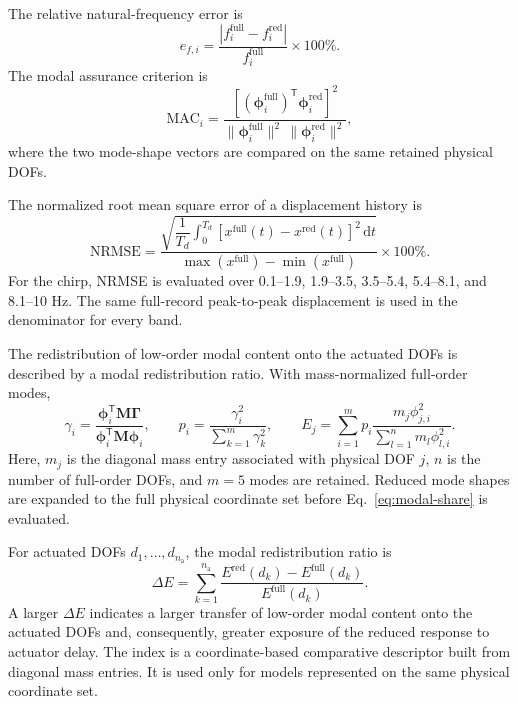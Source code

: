 \documentclass[11pt]{article}
\newenvironment{revision}{\begingroup\color{red}}{\endgroup}
\begin{document}
The relative natural-frequency error is
\begin{equation}
    e_{f,i}=\frac{|f_i^{\mathrm{full}}-f_i^{\mathrm{red}}|}{f_i^{\mathrm{full}}}\times 100\%.
    \label{eq:freq-error}
\end{equation}
The modal assurance criterion is
\begin{equation}
    \mathrm{MAC}_{i}
    =\frac{\left[(\bm{\phi}_{i}^{\mathrm{full}})^{\mathsf{T}}\bm{\phi}_{i}^{\mathrm{red}}\right]^2}
    {\|\bm{\phi}_{i}^{\mathrm{full}}\|^2\,\|\bm{\phi}_{i}^{\mathrm{red}}\|^2},
    \label{eq:mac}
\end{equation}
where the two mode-shape vectors are compared on the same retained physical DOFs.

The normalized root mean square error of a displacement history is
\begin{equation}
    \mathrm{NRMSE}
    =\frac{\sqrt{\dfrac{1}{T_d}\int_{0}^{T_d}
    [x^{\mathrm{full}}(t)-x^{\mathrm{red}}(t)]^2\,\mathrm{d}t}}
    {\max(x^{\mathrm{full}})-\min(x^{\mathrm{full}})}\times 100\%.
    \label{eq:nrmse}
\end{equation}
For the chirp, NRMSE is evaluated over 0.1--1.9, 1.9--3.5, 3.5--5.4, 5.4--8.1, and 8.1--10 Hz. The same full-record peak-to-peak displacement is used in the denominator for every band.

\begin{revision}
The redistribution of low-order modal content onto the actuated DOFs is described by a modal redistribution ratio. With mass-normalized full-order modes,
\end{revision}
\begin{equation}
    \gamma_i=\frac{\bm{\phi}_i^{\mathsf{T}}\mathbf{M}\bm{\Gamma}}
    {\bm{\phi}_i^{\mathsf{T}}\mathbf{M}\bm{\phi}_i},
    \qquad
    p_i=\frac{\gamma_i^2}{\sum_{k=1}^{m}\gamma_k^2},
    \qquad
    E_j=\sum_{i=1}^{m}p_i
    \frac{m_j\phi_{j,i}^{2}}{\sum_{l=1}^{n}m_l\phi_{l,i}^{2}}.
    \label{eq:modal-share}
\end{equation}
Here, \(m_j\) is the diagonal mass entry associated with physical DOF \(j\), \(n\) is the number of full-order DOFs, and \(m=5\) modes are retained. Reduced mode shapes are expanded to the full physical coordinate set before Eq.~\eqref{eq:modal-share} is evaluated.

For actuated DOFs \(d_1,\ldots,d_{n_{\mathrm{a}}}\), the modal redistribution ratio is
\begin{equation}
    \Delta E=\sum_{k=1}^{n_{\mathrm{a}}}
    \frac{E^{\mathrm{red}}(d_k)-E^{\mathrm{full}}(d_k)}{E^{\mathrm{full}}(d_k)}.
    \label{eq:modal-redistribution}
\end{equation}
\begin{revision}
A larger \(\Delta E\) indicates a larger transfer of low-order modal content onto the actuated DOFs and, consequently, greater exposure of the reduced response to actuator delay. The index is a coordinate-based comparative descriptor built from diagonal mass entries. It is used only for models represented on the same physical coordinate set.
\end{revision}
\end{document}
